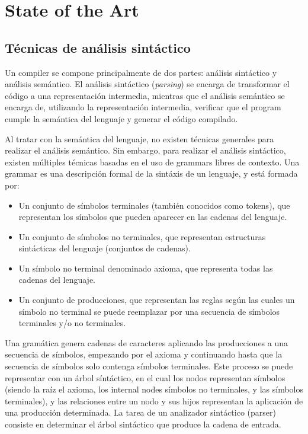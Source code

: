 \chapter{State of the Art}\label{chap:state-of-the-art}

\section{Técnicas de análisis sintáctico}\label{sec:parser-techniques}

Un \gls{compiler} se compone principalmente de dos partes: análisis sintáctico y
análisis semántico. El análisis sintáctico (\textit{parsing}) se encarga de
transformar el código a una representación intermedia, mientras que el análisis
semántico se encarga de, utilizando la representación intermedia, verificar que
el \gls{program} cumple la semántica del lenguaje y generar el código compilado.
\parencite{dragon-book}

Al tratar con la semántica del lenguaje, no existen técnicas generales para
realizar el análisis semántico. Sin embargo, para realizar el análisis
sintáctico, existen múltiples técnicas basadas en el uso de \glspl{grammar}
libres de contexto. Una \gls{grammar} es una descripción formal de la sintáxis
de un lenguaje, y está formada por: \parencite{dragon-book}

\begin{itemize}
    \item Un conjunto de símbolos terminales (también conocidos como
    \glspl{token}), que representan los símbolos que pueden aparecer en las
    cadenas del lenguaje.
    \item Un conjunto de símbolos no terminales, que representan estructuras
    sintácticas del lenguaje (conjuntos de cadenas).
    \item Un símbolo no terminal denominado axioma, que representa todas las
    cadenas del lenguaje.
    \item Un conjunto de producciones, que representan las reglas según las
    cuales un símbolo no terminal se puede reemplazar por una secuencia de
    símbolos terminales y/o no terminales.
\end{itemize}

Una gramática genera cadenas de caracteres aplicando las producciones a una
secuencia de símbolos, empezando por el axioma y continuando hasta que la
secuencia de símbolos solo contenga símbolos terminales. Este proceso se puede
representar con un árbol síntáctico, en el cual los nodos representan símbolos
(siendo la raíz el axioma, los \glspl{internal node} símbolos no terminales, y
las  símbolos terminales), y las relaciones entre un
nodo y sus hijos representan la aplicación de una producción determinada. La
tarea de un analizador sintáctico (\gls{parser}) consiste en determinar el árbol
sintáctico que produce la cadena de entrada. \parencite{dragon-book}

